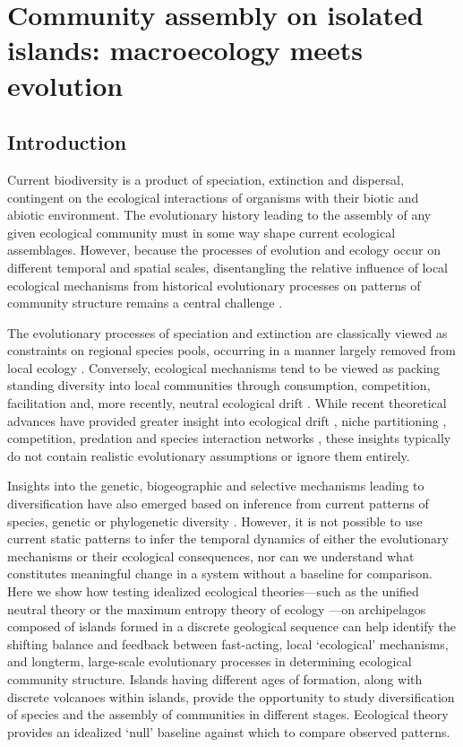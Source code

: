 \chapter{Community assembly on isolated islands: macroecology meets
evolution}

\section{Introduction}

Current biodiversity is a product of speciation, extinction and
dispersal, contingent on the ecological interactions of organisms with
their biotic and abiotic environment. The evolutionary history leading
to the assembly of any given ecological community must in some way
shape current ecological assemblages. However, because the processes
of evolution and ecology occur on different temporal and spatial
scales, disentangling the relative influence of local ecological
mechanisms from historical evolutionary processes on patterns of
community structure remains a central challenge \citep{ricklefs2004}.

The evolutionary processes of speciation and extinction are
classically viewed as constraints on regional species pools, occurring
in a manner largely removed from local ecology \citep{hubbell2001,
  cavenderbares2009, wiens2011}. Conversely, ecological mechanisms
tend to be viewed as packing standing diversity into local communities
through consumption, competition, facilitation and, more recently,
neutral ecological drift \citep{hubbell2001, tilman2004,
  bascompte2007, borer2014}. While recent theoretical advances have
provided greater insight into ecological drift \citep{hubbell2001,
  rosindell2011ecolLett}, niche partitioning \citep{tilman2004},
competition, predation \citep{borer2014} and species interaction
networks \citep{williams2000, brose2006}, these insights typically do
not contain realistic evolutionary assumptions
\citep{ricklefs2006neutral} or ignore them entirely.

Insights into the genetic, biogeographic and selective mechanisms
leading to diversification have also emerged based on inference from
current patterns of species, genetic or phylogenetic diversity
\citep[e.g.][]{wiens2011, jetz2012}. However, it is not possible to
use current static patterns to infer the temporal dynamics of either
the evolutionary mechanisms or their ecological consequences, nor can
we understand what constitutes meaningful change in a system without a
baseline for comparison. Here we show how testing idealized ecological
theories---such as the unified neutral theory \citep{hubbell2001} or
the maximum entropy theory of ecology \citep{harte2011}---on
archipelagos composed of islands formed in a discrete geological
sequence can help identify the shifting balance and feedback between
fast-acting, local ‘ecological’ mechanisms, and longterm, large-scale
evolutionary processes in determining ecological community
structure. Islands having different ages of formation, along with
discrete volcanoes within islands, provide the opportunity to study
diversification of species and the assembly of communities in
different stages. Ecological theory provides an idealized ‘null’
baseline against which to compare observed patterns.


